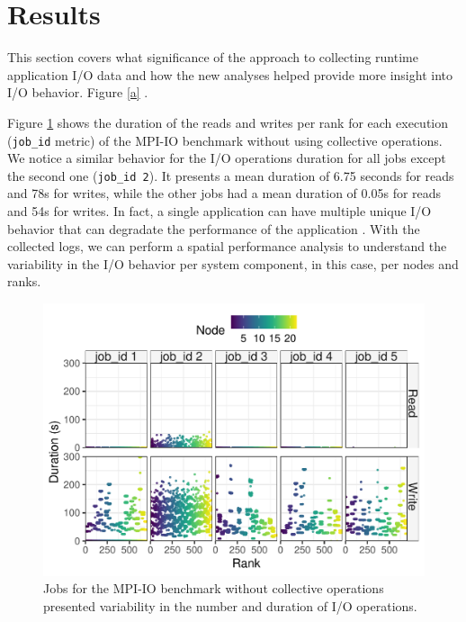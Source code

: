 \section{Results}
\label{sec:results}

This section covers what significance of the approach to collecting
runtime application I/O data and how the new analyses helped provide
more insight into I/O behavior. Figure \ref{a} .

Figure \ref{f:mpi_io_all} shows the duration of the reads and writes
per rank for each execution (\texttt{job\_id} metric) of the MPI-IO
benchmark without using collective operations. We notice a similar
behavior for the I/O operations duration for all jobs except the
second one (\texttt{job\_id 2}). It presents a mean duration of 6.75
seconds for reads and 78s for writes, while the other jobs had a mean
duration of 0.05s for reads and 54s for writes. In fact, a single
application can have multiple unique I/O behavior that can degradate
the performance of the application \cite{costa2021}. With the
collected logs, we can perform a spatial performance analysis to
understand the variability in the I/O behavior per system component,
in this case, per nodes and ranks.

\begin{figure}
	\centering
        \includegraphics[width=\linewidth]{figs/mpi_io_luster_no_coll_duration_allexperiments.pdf}
	\caption{Jobs for the MPI-IO benchmark without collective
          operations presented variability in the number and duration
          of I/O operations.}
	\label{f:mpi_io_all}
\end{figure}

